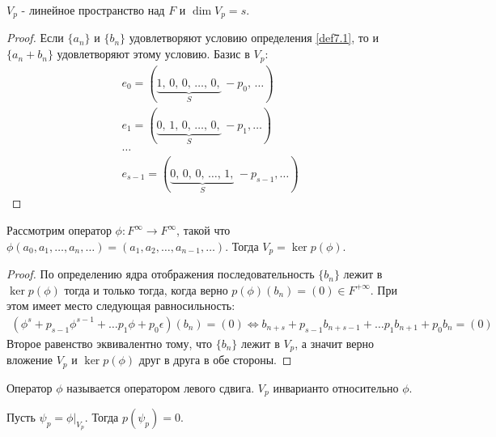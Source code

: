 \begin{proposition}
    $V_p$ - линейное пространство над $F$ и $\dim V_p = s$.
\end{proposition}

\begin{proof}
    Если $\{a_n\}$ и $\{ b_n \}$ удовлетворяют условию определения \ref{def7.1}, 
    то и $\{a_n + b_n\}$ удовлетворяют этому условию.
    Базис в $V_p$:
    \begin{gather*}
        e_0 = (\underbrace{1,\, 0,\, 0,\, \dots,\, 0,}_{S}\, -p_0,\, \dots) \\
        e_1 = (\underbrace{0,\, 1,\, 0,\, \dots,\, 0,}_{S}\, -p_1, \dots) \\
        \dots \\
        e_{s-1} = (\underbrace{0,\, 0,\, 0,\, \dots,\, 1,}_{S}\, -p_{s-1}, \dots)
    \end{gather*}
\end{proof}

\begin{proposition}
    \label{pr7.2}
    Рассмотрим оператор $\phi: F^{\infty} \to F^{\infty}$, такой что 
    $\phi(a_0, a_1, \dots, a_n, \dots) = (a_1, a_2, \dots, a_{n-1}, \dots)$. 
    Тогда $V_p = \ker p(\phi)$.
\end{proposition}

\begin{proof}
    По определению ядра отображения последовательность $\{b_n\}$ лежит в $\ker p(\phi)$ тогда 
    и только тогда, когда верно $p(\phi) (b_n) = (0) \in F^{+\infty}$. При этом имеет место 
    следующая равносильность:
    \begin{eqnarray*}
        (\phi^s + p_{s-1} \phi^{s-1} + \dots p_1 \phi + p_0 \epsilon) (b_n) = (0) \Leftrightarrow
        b_{n+s} + p_{s-1} b_{n+s-1} + \dots p_1 b_{n+1} + p_0 b_n = (0)
    \end{eqnarray*}
    Второе равенство эквивалентно тому, что $\{b_n\}$ лежит в $V_p$, а значит верно вложение $V_p$ и 
    $\ker p(\phi)$ друг в друга в обе стороны.
\end{proof}

\begin{note}
    Оператор $\phi$ называется оператором левого сдвига. $V_p$ инварианто относительно $\phi$.
\end{note}

\begin{corollary}
    Пусть $\psi_p = \phi \vert_{V_p}$. Тогда $p(\psi_p) = 0$.
\end{corollary}

